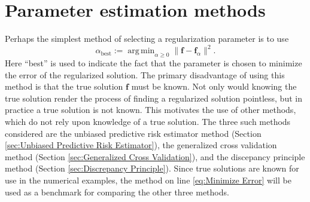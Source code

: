 \documentclass[12pt,notitlepage]{report}
\newcommand{\fVec}{\mathbf{f}}	%
\newcommand{\regparam}{\alpha}
\newcommand{\regf}{\fVec_{\regparam}}	%
\DeclareMathOperator*{\argmin}{arg\,min}
\begin{document}
\chapter{Parameter estimation methods} \label{ch:Parameter estimation methods}

Perhaps the simplest method of selecting a regularization parameter is to use
\begin{equation}
\regparam_{\text{best}} := \argmin_{\regparam \geq 0} \|\fVec - \regf\|^2.
\label{eq:Minimize Error}
\end{equation}
Here ``best'' is used to indicate the fact that the parameter is chosen to minimize the error of the regularized solution. The primary disadvantage of using this method is that the true solution $\fVec$ must be known. Not only would knowing the true solution render the process of finding a regularized solution pointless, but in practice a true solution is not known. This motivates the use of other methods, which do not rely upon knowledge of a true solution. The three such methods considered are the unbiased predictive risk estimator method (Section \ref{sec:Unbiased Predictive Risk Estimator}), the generalized cross validation method (Section \ref{sec:Generalized Cross Validation}), and the discepancy principle method (Section \ref{sec:Discrepancy Principle}). Since true solutions are known for use in the numerical examples, the method on line \eqref{eq:Minimize Error} will be used as a benchmark for comparing the other three methods.
\end{document}

